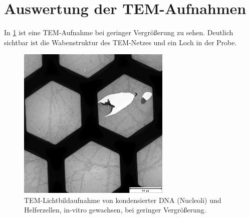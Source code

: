 \section{Auswertung der  TEM-Aufnahmen}



In \cref{fig:tem:waben} ist eine TEM-Aufnahme bei geringer Vergrößerung zu sehen.
Deutlich sichtbar ist die Wabenstruktur des TEM-Netzes und ein Loch in der Probe. %

\begin{figure}[!ht]
    \centering
    \includegraphics[width=0.65\textwidth]{img/TEM/1_low_mag_artifacts.jpg}
    \caption{TEM-Lichtbildaufnahme von kondensierter DNA (Nucleoli) und Helferzellen, in-vitro gewachsen, bei geringer Vergrößerung.}
    \label{fig:tem:waben}
\end{figure}

